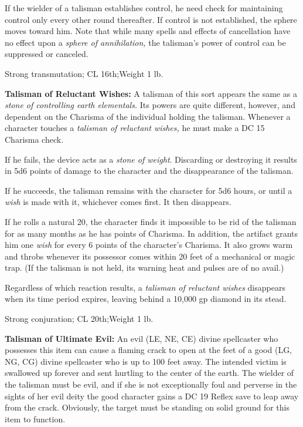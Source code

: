 \documentclass{article}
\begin{document}
If the wielder of a talisman establishes control, he need check for maintaining 
control only every other round thereafter. If control is not established, the sphere 
moves toward him. Note that while many spells and effects of cancellation have 
no effect upon a \textit{sphere of annihilation, }the talisman's power of control 
can be suppressed or canceled.

Strong transmutation; CL 16th;Weight 1 lb.

\vspace{12pt}
\textbf{Talisman of Reluctant Wishes: }A talisman of this sort appears the same 
as a \textit{stone of controlling earth elementals. }Its powers are quite different, 
however, and dependent on the Charisma of the individual holding the talisman. 
Whenever a character touches a \textit{talisman of reluctant wishes, }he must make 
a DC 15 Charisma check. 

If he fails, the device acts as a \textit{stone of weight}. Discarding or destroying 
it results in 5d6 points of damage to the character and the disappearance of the 
talisman. 

If he succeeds, the talisman remains with the character for 5d6 hours, or until 
a \textit{wish }is made with it, whichever comes first. It then disappears.

If he rolls a natural 20, the character finds it impossible to be rid of the talisman 
for as many months as he has points of Charisma. In addition, the artifact grants 
him one \textit{wish }for every 6 points of the character's Charisma. It also grows 
warm and throbs whenever its possessor comes within 20 feet of a mechanical or 
magic trap. (If the talisman is not held, its warning heat and pulses are of no 
avail.)

Regardless of which reaction results, a \textit{talisman of reluctant wishes }disappears 
when its time period expires, leaving behind a 10,000 gp diamond in its stead.

Strong conjuration; CL 20th;Weight 1 lb.

\vspace{12pt}
\textbf{Talisman of Ultimate Evil:} An evil (LE, NE, CE) divine spellcaster who 
possesses this item can cause a flaming crack to open at the feet of a good (LG, 
NG, CG) divine spellcaster who is up to 100 feet away. The intended victim is swallowed 
up forever and sent hurtling to the center of the earth. The wielder of the talisman 
must be evil, and if she is not exceptionally foul and perverse in the sights of 
her evil deity the good character gains a DC 19 Reflex save to leap away from the 
crack. Obviously, the target must be standing on solid ground for this item to 
function. 
\end{document}
